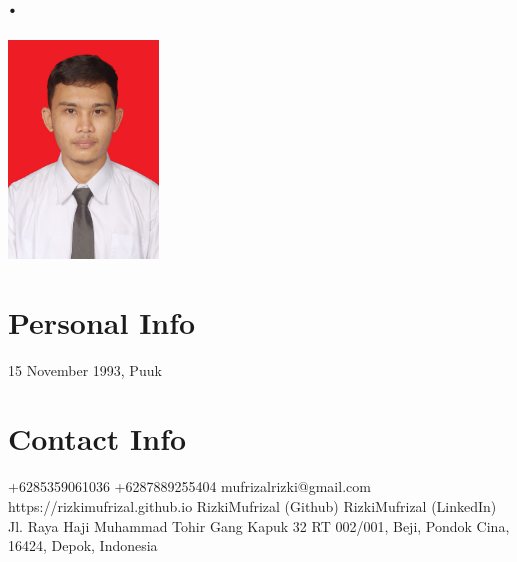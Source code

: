 \documentclass[english]{cv-style}
\begin{document}

\begin{aside}
\section{.}
\includegraphics[width=4cm]{foto}
%
\section{Personal Info}
15 November 1993, Puuk
%
\section{Contact Info}
+6285359061036
+6287889255404
mufrizalrizki@gmail.com
https://rizkimufrizal.github.io
RizkiMufrizal (Github)
RizkiMufrizal (LinkedIn)
~
Jl. Raya Haji Muhammad Tohir Gang Kapuk 32 RT 002/001, Beji, Pondok Cina, 16424, Depok, Indonesia
%
\end{aside}
\end{document}

